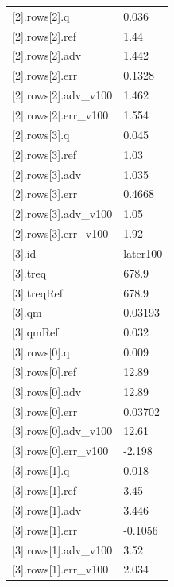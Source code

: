 {\begin{longtable}{p{}p{}}
{}[2].rows[2].q & 0.036\\
{}[2].rows[2].ref & 1.44\\
{}[2].rows[2].adv & 1.442\\
{}[2].rows[2].err & 0.1328\\
{}[2].rows[2].adv\_v100 & 1.462\\
{}[2].rows[2].err\_v100 & 1.554\\
{}[2].rows[3].q & 0.045\\
{}[2].rows[3].ref & 1.03\\
{}[2].rows[3].adv & 1.035\\
{}[2].rows[3].err & 0.4668\\
{}[2].rows[3].adv\_v100 & 1.05\\
{}[2].rows[3].err\_v100 & 1.92\\
{}[3].id & later100\\
{}[3].treq & 678.9\\
{}[3].treqRef & 678.9\\
{}[3].qm & 0.03193\\
{}[3].qmRef & 0.032\\
{}[3].rows[0].q & 0.009\\
{}[3].rows[0].ref & 12.89\\
{}[3].rows[0].adv & 12.89\\
{}[3].rows[0].err & 0.03702\\
{}[3].rows[0].adv\_v100 & 12.61\\
{}[3].rows[0].err\_v100 & -2.198\\
{}[3].rows[1].q & 0.018\\
{}[3].rows[1].ref & 3.45\\
{}[3].rows[1].adv & 3.446\\
{}[3].rows[1].err & -0.1056\\
{}[3].rows[1].adv\_v100 & 3.52\\
{}[3].rows[1].err\_v100 & 2.034\\
\bottomrule\end{longtable}}

